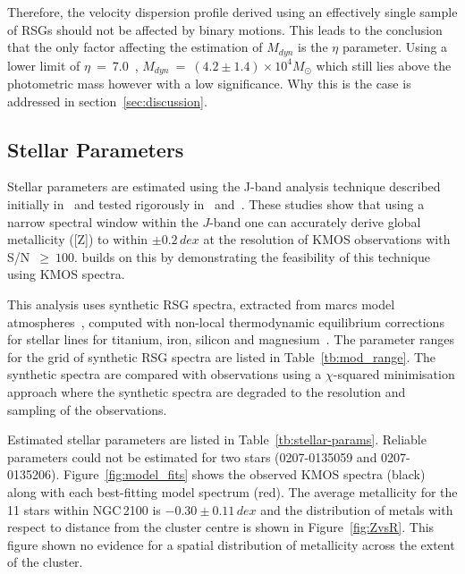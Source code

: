 \documentclass[useAMS,usenatbib]{mn2e}
\begin{document}
Therefore, the velocity dispersion profile derived using an effectively single sample of RSGs should not be affected by binary motions.
This leads to the conclusion that the only factor affecting the estimation of $M_{dyn}$ is the $\eta$ parameter.
Using a lower limit of $\eta~=~7.0$~\citep[estimated from Fig. 4a from ][]{2010ARA&A..48..431P}, $M_{dyn}~=~(4.2\pm1.4)\times 10^{4}M_{\odot}$ which still lies above the photometric mass however with a low significance.
Why this is the case is addressed in section~\ref{sec:discussion}.





\subsection{Stellar Parameters} %
\label{sub:stellar_parameters}

Stellar parameters are estimated using the J-band analysis technique described initially in~\cite{2010MNRAS.407.1203D}
and tested rigorously in~\cite{2014ApJ...788...58G} and~\cite{2015ApJ...806...21D}.
These studies show that using a narrow spectral window within the $J$-band one can accurately derive global metallicity ([Z]) to within
$\pm0.2\,dex$ at the resolution of KMOS observations with S/N~$\ge~100$.
\cite{2015ApJ...803...14P} builds on this by demonstrating the feasibility of this technique using KMOS spectra.

This analysis uses synthetic RSG spectra, extracted from {\sc marcs} model atmospheres~\citep{2008A&A...486..951G}, computed with non-local thermodynamic equilibrium corrections for stellar lines for titanium, iron, silicon and magnesium~\citep{2012ApJ...751..156B,2013ApJ...764..115B,2015ApJ...804..113B}.
The parameter ranges for the grid of synthetic RSG spectra are listed in Table~\ref{tb:mod_range}.
The synthetic spectra are compared with observations using a $\chi$-squared minimisation approach where the synthetic spectra are degraded to the resolution and sampling of the observations.

Estimated stellar parameters are listed in Table~\ref{tb:stellar-params}.
Reliable parameters could not be estimated for two stars (0207-0135059 and 0207-0135206).
Figure~\ref{fig:model_fits} shows the observed KMOS spectra (black) along with each best-fitting model spectrum (red).
The average metallicity for the 11 stars within NGC\,2100 is $-0.30\pm0.11\,dex$ and the distribution of metals with respect to distance from the cluster centre is shown in Figure~\ref{fig:ZvsR}.
This figure shown no evidence for a spatial distribution of metallicity across the extent of the cluster.
\end{document}
